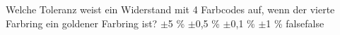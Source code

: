     {Welche Toleranz weist ein Widerstand mit 4 Farbcodes auf, wenn der vierte Farbring ein goldener Farbring ist?}
    { $±$5 \%}
    { $±$0,5 \%}
    { $±$0,1 \%}
    { $±$1 \%}
    {false}{false}